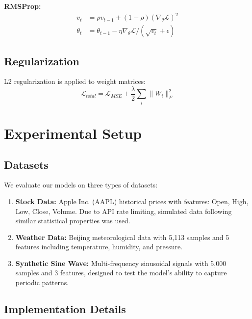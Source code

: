 \documentclass[11pt,a4paper]{article}
\begin{document}
\textbf{RMSProp:}
\begin{align}
    v_t &= \rho v_{t-1} + (1-\rho) (\nabla_\theta \mathcal{L})^2 \\
    \theta_t &= \theta_{t-1} - \eta \nabla_\theta \mathcal{L} / (\sqrt{v_t} + \epsilon)
\end{align}

\subsection{Regularization}

L2 regularization is applied to weight matrices:
\begin{equation}
    \mathcal{L}_{total} = \mathcal{L}_{MSE} + \frac{\lambda}{2} \sum_i \|W_i\|_F^2
\end{equation}

\section{Experimental Setup}

\subsection{Datasets}

We evaluate our models on three types of datasets:

\begin{enumerate}
    \item \textbf{Stock Data:} Apple Inc. (AAPL) historical prices with features: Open, High, Low, Close, Volume. Due to API rate limiting, simulated data following similar statistical properties was used.
    
    \item \textbf{Weather Data:} Beijing meteorological data with 5,113 samples and 5 features including temperature, humidity, and pressure.
    
    \item \textbf{Synthetic Sine Wave:} Multi-frequency sinusoidal signals with 5,000 samples and 3 features, designed to test the model's ability to capture periodic patterns.
\end{enumerate}

\subsection{Implementation Details}
\end{document}
